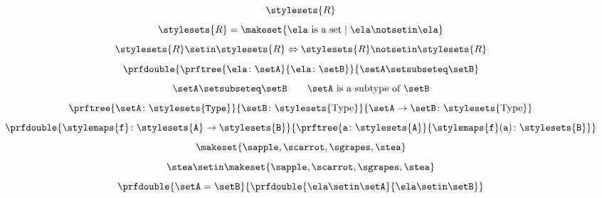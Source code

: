 {\begin{forslides}
\begin{equation}
            \stylesets{R}
        \end{equation}
        \begin{equation}
            \label{eq:russel_2_session1_22}
            \stylesets{R}=\makeset{\ela \text{ is a set}\mid \ela \notsetin \ela}
        \end{equation}
        \begin{equation}
            \label{eq:russel_3_session1_22}
            \stylesets{R} \setin \stylesets{R} \Leftrightarrow \stylesets{R} \notsetin \stylesets{R}
        \end{equation}
        \begin{equation}
            \label{eq:types_session1_22}
            \prfdouble{\prftree{\ela \colon \setA}{\ela \colon \setB}}{\setA \setsubseteq \setB}
        \end{equation}
        \begin{equation}
            \label{eq:types_2_session1_22}
            \setA \setsubseteq \setB \qquad \setA \text{ is a subtype of }\setB
        \end{equation}
        \begin{equation}
            \label{eq:types_3_session1_22}
            \prftree{\setA\colon \stylesets{\texttt{Type}}}{\setB\colon \stylesets{\text{Type}}}{{\setA\to \setB \colon \stylesets{\text{Type}}}}
        \end{equation}
        \begin{equation}
            \label{eq:types_4_session1_22}
            \prfdouble{\stylemaps{\texttt{f}}\colon \stylesets{\texttt{A}}\to \stylesets{\texttt{B}}}{\prftree{\texttt{a}\colon \stylesets{\texttt{A}}}{\stylemaps{\texttt{f}}(\texttt{a})\colon \stylesets{\texttt{B}}}}
        \end{equation}
        \begin{equation}
            \label{eq:1_session1_22}
            \makeset{\sapple,\scarrot,\sgrapes,\stea}
        \end{equation}
        \begin{equation}
            \label{eq:2_session1_22}
            \stea \setin \makeset{\sapple,\scarrot,\sgrapes,\stea}
        \end{equation}
        \begin{equation}
            \label{eq:3_session1_22}
            \prfdouble{\setA =\setB}{\prfdouble{\ela \setin \setA}{\ela\setin \setB}}
        \end{equation}
        \begin{equation}

\end{equation}
\end{forslides}}
